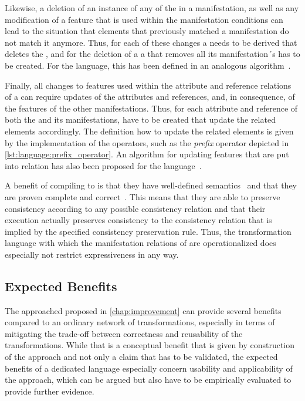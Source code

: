 Likewise, a deletion of an instance of any of the \metaclasses in a manifestation, as well as any modification of a feature that is used within the manifestation conditions can lead to the situation that elements that previously matched a manifestation do not match it anymore.
Thus, for each of these changes a \reaction needs to be derived that deletes the \commonality, and for the deletion of a \commonality a \reaction that removes all its manifestation´s has to be created.
For the \mappings language, this has been defined in an analogous algorithm~\cite[Alg. 2]{kramer2017a}.

Finally, all changes to features used within the attribute and reference relations of a \commonality can require updates of the \commonality attributes and references, and, in consequence, of the features of the other manifestations.
Thus, for each attribute and reference of both the \commonality and its manifestations, \reactions have to be created that update the related elements accordingly.
The definition how to update the related elements is given by the implementation of the operators, such as the \emph{prefix} operator depicted in \autoref{lst:language:prefix_operator}.
An algorithm for updating features that are put into relation has also been proposed for the \mappings language~\cite[Alg. 3]{kramer2017a}.

A benefit of compiling to \reactions is that they have well-defined semantics~\cite[Sec. 6.7]{kramer2017a} and that they are proven complete and correct~\cite[Sec. 9.2.4 and 9.3]{kramer2017a}.
This means that they are able to preserve consistency according to any possible consistency relation and that their execution actually preserves consistency to the consistency relation that is implied by the specified consistency preservation rule.
Thus, the transformation language with which the manifestation relations of \commonalities are operationalized does especially not restrict expressiveness in any way.


\subsection{Expected Benefits}
\label{chap:language:commonalities:benefits}

The \commonalities approached proposed in \autoref{chap:improvement} can provide several benefits compared to an ordinary network of transformations, especially in terms of mitigating the trade-off between correctness and reusability of the transformations.
While that is a conceptual benefit that is given by construction of the approach and not only a claim that has to be validated, the expected benefits of a dedicated \commonalities language especially concern usability and applicability of the approach, which can be argued but also have to be empirically evaluated to provide further evidence.

